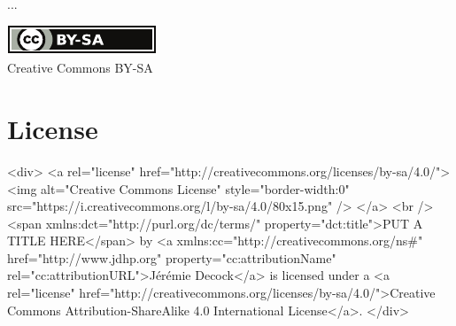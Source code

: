 \documentclass{article}
\begin{document}
...







\ifpdf

    \vfill %
    \begin{center}
        \href{http://creativecommons.org/licenses/by-sa/4.0/}{\includegraphics[width=.15\linewidth]{fig/cc_by_sa_small}}\\
        \small{Creative Commons BY-SA}
    \end{center}

\else

    \section*{License}\label{sec:license}

    \begin{rawhtml}

        <div>
            <a rel="license" href="http://creativecommons.org/licenses/by-sa/4.0/">
                <img alt="Creative Commons License" style="border-width:0" src="https://i.creativecommons.org/l/by-sa/4.0/80x15.png" />
            </a>
            <br />
            <span xmlns:dct="http://purl.org/dc/terms/" property="dct:title">PUT A TITLE HERE</span>
            by <a xmlns:cc="http://creativecommons.org/ns#" href="http://www.jdhp.org" property="cc:attributionName" rel="cc:attributionURL">Jérémie Decock</a>
            is licensed under a
            <a rel="license" href="http://creativecommons.org/licenses/by-sa/4.0/">Creative Commons Attribution-ShareAlike 4.0 International License</a>.
        </div>

    \end{rawhtml}
 
\end{document}
